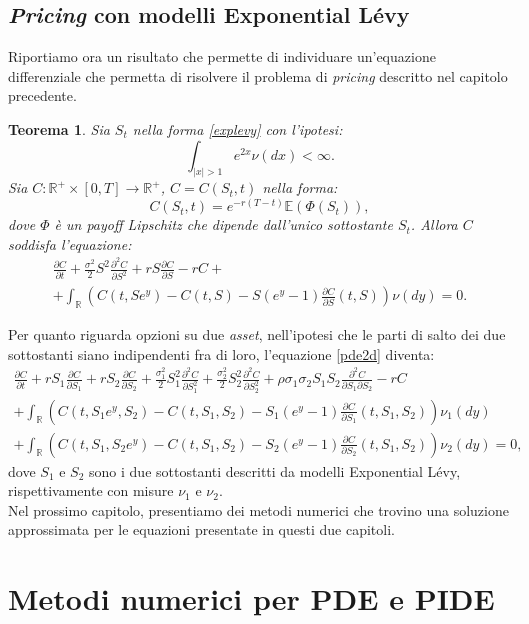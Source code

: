 \documentclass[a4paper,10pt]{report}
\newcommand{\der}[2]{\frac{\partial #1}{\partial #2}}
\newcommand{\dder}[2]{\frac{\partial^2 #1}{\partial #2^2}}
\newcommand{\dmix}[3]{\frac{\partial^2 #1}{\partial #2 \partial #3}}
\theoremstyle{plain}
\newtheorem{theorem}{Teorema}[chapter]
\theoremstyle{definition}
\theoremstyle{remark}
\begin{document}
\section{\emph{Pricing} con modelli Exponential L\'evy}
Riportiamo ora un risultato che permette di individuare un'equazione differenziale che permetta di risolvere il problema di \emph{pricing} descritto nel capitolo precedente.
\begin{theorem}
Sia $S_t$ nella forma \ref{explevy} con l'ipotesi: $$\int_{|x|>1} e^{2x}\nu(dx)<\infty.$$ Sia $C:\mathbb{R}^+\times[0,T]\rightarrow\mathbb{R}^+$, $C=C(S_t,t)$ nella forma: $$C(S_t,t)=e^{-r(T-t)}\mathbb{E}(\Phi(S_t)),$$ dove $\Phi$ \`e un \emph{payoff Lipschitz} che dipende dall'unico sottostante $S_t$. Allora $C$ soddisfa l'equazione:
\begin{multline}
\der{C}{t}+\frac{\sigma^2}{2}S^2\dder{C}{S}+rS\der{C}{S}-rC+\\+ \int_\mathbb{R}\left(C(t,Se^y)-C(t,S)-S(e^y-1)\der{C}{S}(t,S)\right)\nu(dy)=0.
\end{multline}
\end{theorem}
Per quanto riguarda opzioni su due \emph{asset}, nell'ipotesi che le parti di salto dei due sottostanti siano indipendenti fra di loro, l'equazione \ref{pde2d} diventa:
\begin{multline}
\der{C}{t}+rS_1\der{C}{S_1}+rS_2\der{C}{S_2}+\frac{\sigma^2_1}{2}S_1^2\dder{C}{S_1}+\frac{\sigma^2_2}{2}S_2^2\dder{C}{S_2}+\rho\sigma_1\sigma_2S_1S_2\dmix{C}{S_1}{S_2}-rC\\+\int_\mathbb{R}\left(C(t,S_1e^y,S_2)-C(t,S_1,S_2)-S_1(e^y-1)\der{C}{S_1}(t,S_1,S_2)\right)\nu_1(dy)\\+\int_\mathbb{R}\left(C(t,S_1,S_2e^y)-C(t,S_1,S_2)-S_2(e^y-1)\der{C}{S_2}(t,S_1,S_2)\right)\nu_2(dy)=0,
\label{pide2d}
\end{multline}
dove $S_1$ e $S_2$ sono i due sottostanti descritti da modelli Exponential L\'evy, rispettivamente con misure $\nu_1$ e $\nu_2$.\\Nel prossimo capitolo, presentiamo dei metodi numerici che trovino una soluzione approssimata per le equazioni presentate in questi due capitoli.

\chapter{Metodi numerici per PDE e PIDE}
\end{document}
